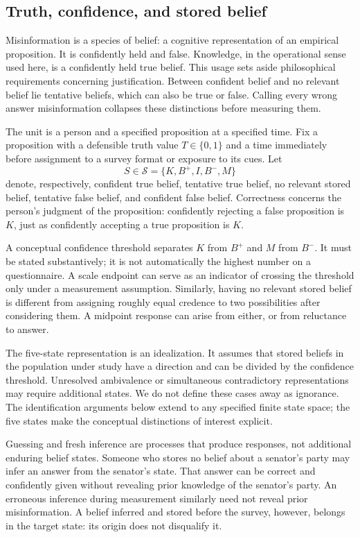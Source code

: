 \documentclass[11pt]{article}
\newcommand{\states}{\mathcal{S}}
\begin{document}
\subsection{Truth, confidence, and stored belief}

Misinformation is a species of belief: a cognitive representation of an empirical proposition. It is confidently held and false. Knowledge, in the operational sense used here, is a confidently held true belief. This usage sets aside philosophical requirements concerning justification. Between confident belief and no relevant belief lie tentative beliefs, which can also be true or false. Calling every wrong answer misinformation collapses these distinctions before measuring them.

The unit is a person and a specified proposition at a specified time. Fix a proposition with a defensible truth value $T\in\{0,1\}$ and a time immediately before assignment to a survey format or exposure to its cues. Let
\[
S\in\states=\{K,B^+,I,B^-,M\}
\]
denote, respectively, confident true belief, tentative true belief, no relevant stored belief, tentative false belief, and confident false belief. Correctness concerns the person's judgment of the proposition: confidently rejecting a false proposition is $K$, just as confidently accepting a true proposition is $K$.

A conceptual confidence threshold separates $K$ from $B^+$ and $M$ from $B^-$. It must be stated substantively; it is not automatically the highest number on a questionnaire. A scale endpoint can serve as an indicator of crossing the threshold only under a measurement assumption. Similarly, having no relevant stored belief is different from assigning roughly equal credence to two possibilities after considering them. A midpoint response can arise from either, or from reluctance to answer.

The five-state representation is an idealization. It assumes that stored beliefs in the population under study have a direction and can be divided by the confidence threshold. Unresolved ambivalence or simultaneous contradictory representations may require additional states. We do not define these cases away as ignorance. The identification arguments below extend to any specified finite state space; the five states make the conceptual distinctions of interest explicit.

Guessing and fresh inference are processes that produce responses, not additional enduring belief states. Someone who stores no belief about a senator's party may infer an answer from the senator's state. That answer can be correct and confidently given without revealing prior knowledge of the senator's party. An erroneous inference during measurement similarly need not reveal prior misinformation. A belief inferred and stored before the survey, however, belongs in the target state: its origin does not disqualify it.
\end{document}
